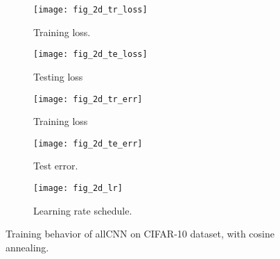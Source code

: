\documentclass[12pt]{article}
\begin{document}
   \begin{figure}
     \centering
     \begin{subfigure}[b]{0.3\textwidth}
         \centering
         \texttt{[image: fig\_2d\_tr\_loss]}
         \caption{Training loss. }
         \label{fig:y equals x}
     \end{subfigure}
     \hfill
     \begin{subfigure}[b]{0.3\textwidth}
         \centering
         \texttt{[image: fig\_2d\_te\_loss]}
         \caption{Testing loss}
         \label{fig:three sin x}
     \end{subfigure}
     \hfill
     \begin{subfigure}[b]{0.3\textwidth}
         \centering
         \texttt{[image: fig\_2d\_tr\_err]}
         \caption{Training loss}
         \label{fig:five over x}
     \end{subfigure}
      \begin{subfigure}[b]{0.3\textwidth}
         \centering
         \texttt{[image: fig\_2d\_te\_err]}
         \caption{Test error. }
         \label{fig:y equals x}
     \end{subfigure}
     \hfill
     \begin{subfigure}[b]{0.3\textwidth}
         \centering
         \texttt{[image: fig\_2d\_lr]}
         \caption{Learning rate schedule. }
         \label{fig:y equals x}
     \end{subfigure}
     \hfil
        \caption{Training behavior of allCNN on CIFAR-10 dataset, with cosine annealing. }
        \label{fig:three graphs}
\end{figure}
\end{document}

